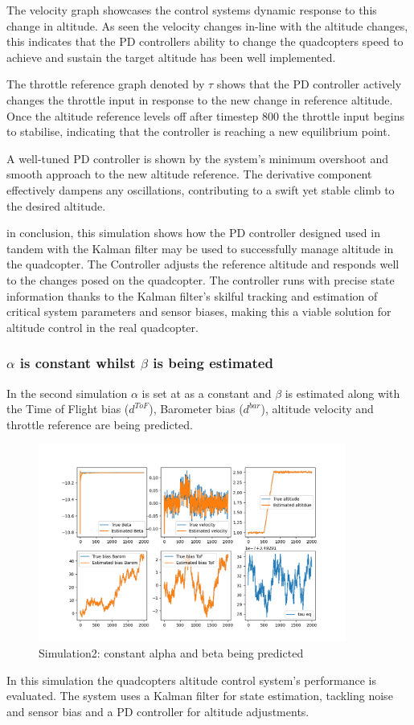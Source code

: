 \documentclass{report}
\begin{document}
The velocity graph showcases the control systems dynamic response to this change
in altitude. As seen the velocity changes in-line with the altitude changes,
this indicates that the PD controllers ability to change the quadcopters speed
to achieve and sustain the target altitude has been well implemented.

The throttle reference graph denoted by \(\tau\) shows that the PD controller
actively changes the throttle input in response to the new change in reference
altitude. Once the altitude reference levels off after timestep 800 the throttle
input begins to stabilise, indicating that the controller is reaching a new
equilibrium point.
 
A well-tuned PD controller is shown by the system's minimum overshoot and smooth
approach to the new altitude reference. The derivative component effectively
dampens any oscillations, contributing to a swift yet stable climb to the
desired altitude.

in conclusion, this simulation shows how the PD controller designed used in
tandem with the Kalman filter may be used to successfully manage altitude in the
quadcopter. The Controller adjusts the reference altitude and responds well to
the changes posed on the quadcopter. The controller runs with precise state
information thanks to the Kalman filter's skilful tracking and estimation of
critical system parameters and sensor biases, making this a viable solution for
altitude control in the real quadcopter.



\subsubsection*{\(\alpha\) is constant whilst \(\beta\) is being estimated}
In the second simulation \(\alpha\) is set at as a constant and \(\beta\) is
estimated along with the Time of Flight bias (\(d^{ToF}\)), Barometer bias
(\(d^{bar}\)), altitude velocity and throttle reference are being predicted.
\begin{figure}[H]
  \centering
  \includegraphics[width=0.9\textwidth]{Pictures/a_constant_PD.png}
  \caption{Simulation2: constant alpha and beta being predicted}
  \label{fig:a_constant_PD}
\end{figure}
In this simulation the quadcopters altitude control system's performance is
evaluated. The system uses a Kalman filter for state estimation, tackling noise
and sensor bias and a PD controller for altitude adjustments.
\end{document}
